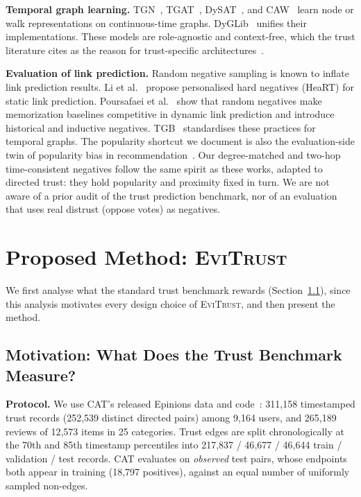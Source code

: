 \documentclass[conference]{IEEEtran}
\newcommand{\evi}{\textsc{EviTrust}}
\begin{document}
\textbf{Temporal graph learning.} TGN~\cite{rossi2020tgn}, TGAT~\cite{xu2020tgat}, DySAT~\cite{sankar2020dysat}, and CAW~\cite{wang2021caw} learn node or walk representations on continuous-time graphs. DyGLib~\cite{yu2023dyglib} unifies their implementations. These models are role-agnostic and context-free, which the trust literature cites as the reason for trust-specific architectures~\cite{wang2025cat}.

\textbf{Evaluation of link prediction.} Random negative sampling is known to inflate link prediction results. Li et al.~\cite{li2023evaluating} propose personalised hard negatives (HeaRT) for static link prediction. Poursafaei et al.~\cite{poursafaei2022towards} show that random negatives make memorization baselines competitive in dynamic link prediction and introduce historical and inductive negatives. TGB~\cite{huang2023tgb} standardises these practices for temporal graphs. The popularity shortcut we document is also the evaluation-side twin of popularity bias in recommendation~\cite{abdollahpouri2017popularity}. Our degree-matched and two-hop time-consistent negatives follow the same spirit as these works, adapted to directed trust: they hold popularity and proximity fixed in turn. We are not aware of a prior audit of the trust prediction benchmark, nor of an evaluation that uses real distrust (oppose votes) as negatives.

\section{Proposed Method: \evi{}}
\label{sec:method}

We first analyse what the standard trust benchmark rewards (Section~\ref{sec:motivation}), since this analysis motivates every design choice of \evi{}, and then present the method.

\subsection{Motivation: What Does the Trust Benchmark Measure?}
\label{sec:motivation}

\textbf{Protocol.} We use CAT's released Epinions data and code~\cite{wang2025cat}: 311{,}158 timestamped trust records (252{,}539 distinct directed pairs) among 9{,}164 users, and 265{,}189 reviews of 12{,}573 items in 25 categories. Trust edges are split chronologically at the 70th and 85th timestamp percentiles into 217{,}837 / 46{,}677 / 46{,}644 train / validation / test records. CAT evaluates on \emph{observed} test pairs, whose endpoints both appear in training (18{,}797 positives), against an equal number of uniformly sampled non-edges.
\end{document}
